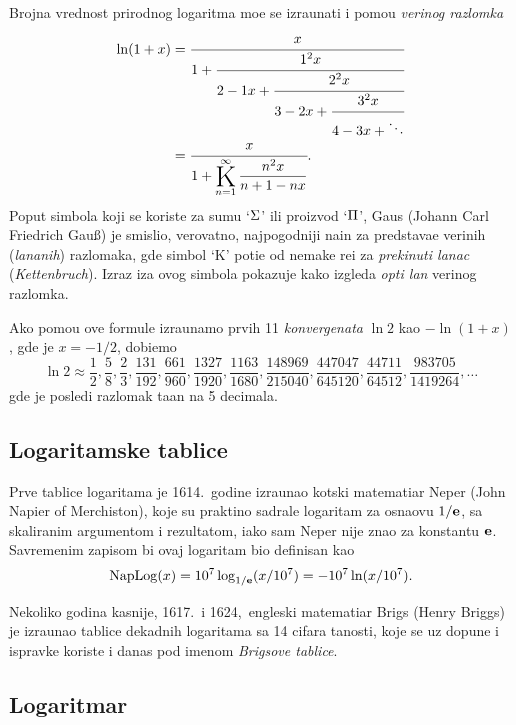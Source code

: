\documentclass[12pt, twoside, a4paper]{article}
\def\K{\mathop{\vcenter{\hbox{\rm\huge K}}}\limits}
\def\n{n}
\def\Ki{\K_{\n=1}}
\def\Kinf#1#2{\Ki^\infty\displaystyle{\frac{#1}{#2}}}
\def\e{{\bf e}}
\def\naplog{\mathop{\rm NapLog}\nolimits}
\begin{document}
Brojna vrednost prirodnog logaritma mo{\zv}e se izra{\cv}unati i pomo{\cc}u {\sl veri{\zv}nog razlomka}
\begin{equation}\label{eq:verige}
\begin{aligned}
\ln(1+x)
&=\cfrac{x}{1+\cfrac{1^2x}{2-1x+\cfrac{2^2x}{3-2x+\cfrac{3^2x}{4-3x+\ddots}}}}\\
\noalign{\vskip-3pt}
&=\cfrac{x}{1+ \Kinf{\n^2x}{\n+1-\n x}}.
\end{aligned}
\end{equation}
Poput simbola koji se koriste za sumu `$\rm\Sigma$' ili proizvod `$\rm\Pi$', 
Gaus (Johann Carl Friedrich Gau\ss) je smislio, verovatno, najpogodniji na{\cv}in za predstav{\lj}a{\nj}e
veri{\zv}nih ({\sl lan\-{\cv}a\-nih\/}) razlomaka,
gde simbol `K' poti{\cv}e od nema{\cv}ke re{\cv}i za {\sl prekinuti lanac\/} ({\sl Kettenbruch\/}). 
Izraz iza ovog simbola pokazuje kako izgleda {\sl op{\sv}ti {\cv}lan\/} veri{\zv}nog razlomka.

\def\ff#1/#2,{\frac{#1}{#2},}
Ako pomo{\cc}u ove formule izra{\cv}unamo prvih 11 {\sl konvergenata\/} $\ln2$ kao $-\ln(1+x)$, 
gde je $x=-1/2$,
dobi{\cc}emo
$$
\ln2\approx\ff1/2, \ff5/8, \ff2/3, \ff131/192, \ff661/960, \ff1327/1920, \ff1163/1680, \ff148969/215040, 
\ff447047/645120, \ff44711/64512, \ff983705/1419264, \dots
$$
gde je posled{\nj}i razlomak ta{\cv}an na 5 decimala.


\subsection{Logaritamske tablice}

Prve tablice logaritama je 1614.\ godine izra{\cv}unao {\sv}kotski matemati{\cv}ar Neper (John Napier of Merchiston),
koje su prakti{\cv}no sadr{\zv}ale logaritam za osnaovu $1/\e$, sa ska\-li\-ra\-nim argumentom i rezultatom,
iako sam Neper nije znao za konstantu $\e$.
Savremenim zapisom bi ovaj logaritam bio definisan kao
$$
\naplog (x) = 10^7\log_{1/\e}(x/10^7) = -10^7\ln(x/10^7).
$$

Nekoliko godina kasnije, 1617.\ i 1624,\ engleski matemati{\cv}ar Brigs (Henry Briggs) je izra{\cv}unao
tablice de\-kad\-nih logaritama sa 14 cifara ta{\cv}nosti, koje se uz dopune i ispravke
koriste i danas pod imenom {\sl Brigsove tablice}.


\subsection{Logaritmar}
\end{document}
